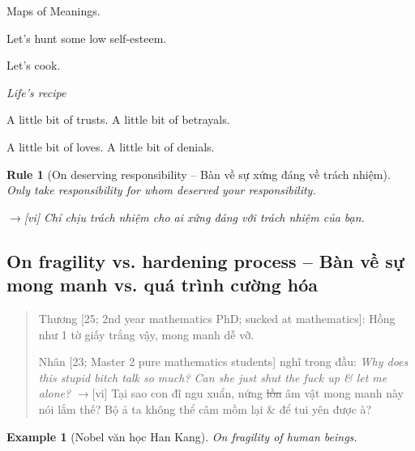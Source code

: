 \documentclass[12pt,twoside]{book}
\newtheorem{example}{Example}
\newtheorem{Rule}{Rule}
\begin{document}
Maps of Meanings.

Let's hunt some low self-esteem.

Let's cook.

\begin{center}\it
	{\sc Life's recipe}
	
	A little bit of trusts. A little bit of betrayals.
	
	A little bit of loves. A little bit of denials.
\end{center}

\begin{Rule}[On deserving responsibility -- Bàn về sự xứng đáng về trách nhiệm] 
	Only take responsibility for whom deserved your responsibility.
	
	{\sf[en]$\to$[vi]} Chỉ chịu trách nhiệm cho ai xứng đáng với trách nhiệm của bạn.
\end{Rule}

\subsection{On fragility vs. hardening process -- Bàn về sự mong manh vs. quá trình cường hóa}

\begin{quote}
	{\sf Thương [25; 2nd year mathematics PhD; sucked at mathematics]}: Hồng như 1 tờ giấy trắng vậy, mong manh dễ vỡ.
	
	{\sf Nhân [23; Master 2 pure mathematics students]} nghĩ trong đầu: {\it Why does this stupid bitch talk so much? Can she just shut the fuck up \& let me alone?} {\sf[en]$\to$[vi]} Tại sao con đĩ ngu xuẩn, nứng \st{lồn} âm vật mong manh này nói lắm thế? Bộ ả ta không thể câm mồm lại \& để tui yên được à?
\end{quote}

\begin{example}[Nobel văn học Han Kang]
	On fragility of human beings.
\end{example}
\end{document}
